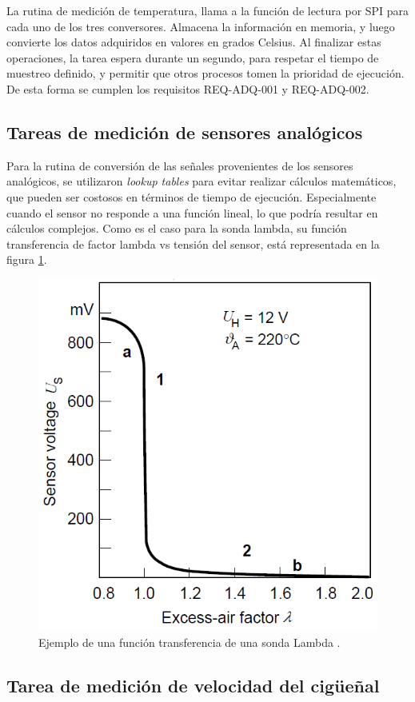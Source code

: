 La rutina de medición de temperatura, llama a la función de lectura por SPI para cada uno de los tres conversores. Almacena la información en memoria, y luego convierte los datos adquiridos en valores en grados Celsius. Al finalizar estas operaciones, la tarea espera durante un segundo, para respetar el tiempo de muestreo definido, y permitir que otros procesos tomen la prioridad de ejecución. De esta forma se cumplen los requisitos REQ-ADQ-001 y REQ-ADQ-002.

\subsection{Tareas de medición de sensores analógicos}

Para la rutina de conversión de las señales provenientes de los sensores analógicos, se utilizaron \textit{lookup tables} para evitar realizar cálculos matemáticos, que pueden ser costosos en términos de tiempo de ejecución. Especialmente cuando el sensor no responde a una función lineal, lo que podría resultar en cálculos complejos. Como es el caso para la sonda lambda, su función transferencia de factor lambda vs tensión del sensor, está representada en la figura \ref{fig:funcion-lambda}.

\begin{figure}[htpb]
\centering
\includegraphics[width=.55\textwidth]{./Figures/funcion-lambda.png}
\caption{Ejemplo de una función transferencia de una sonda Lambda \protect\footnotemark[3].}
\label{fig:funcion-lambda}
\end{figure}

\subsection{Tarea de medición de velocidad del cigüeñal}

